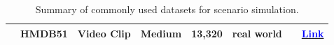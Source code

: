 \begin{table}[!htp]
{\begin{tabular}{c|c|c|c|c|c|c|c}
                                                                                  & HMDB51                 & Video Clip              & Medium              & 13,320           & real world          & \cite{xie2024dreamfactory}                                                                                                                                                      & \href{https://serre-lab.clps.brown.edu/resource/hmdb-a-large-human-motion-database/}{\textcolor{blue}{Link}}                                                      \\ \bottomrule




\end{tabular}
}
\vspace{-3mm}
\caption{Summary of commonly used datasets for scenario simulation.}
\label{tab:task_data}
\end{table}